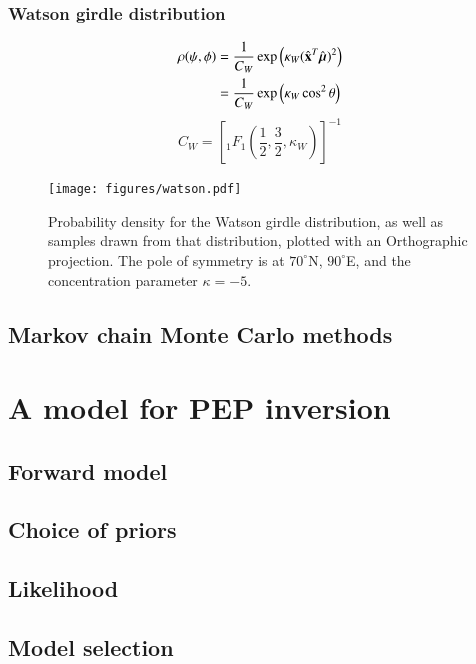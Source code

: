 \documentclass[preprint,12pt,authoryear]{elsarticle}
\newcommand{\mitbf}[1]{\hbox{\mathversion{bold}$#1$}}
\begin{document}
\subsubsection{Watson girdle distribution}
\begin{equation}
  \begin{aligned}
  \rho(\psi, \phi) 
  &= \frac{1}{C_W} \exp \left( \kappa_W (\hat{\mathbf{x}}^T \hat{\mitbf{\mu}})^2 \right) \\
  &= \frac{1}{C_W} \exp \left( \kappa_W \cos^2 \theta \right)
  \end{aligned}
\end{equation}
\begin{equation}
  C_W = \left[ {}_1 F_1 \left( \frac{1}{2}, \frac{3}{2}, \kappa_W \right) \right]^{-1}
\end{equation}

\begin{figure}
\texttt{[image: figures/watson.pdf]}
\caption{Probability density for the Watson girdle distribution, as well as samples drawn from that distribution, plotted with an Orthographic projection. The pole of symmetry is at $70^\circ$N, $90^\circ$E, and the concentration parameter $\kappa=-5$.}
\label{fig:watson}
\end{figure}
\subsection{Markov chain Monte Carlo methods}

\section{A model for PEP inversion}
\label{sec:model}
\subsection{Forward model}

\subsection{Choice of priors}

\subsection{Likelihood}

\subsection{Model selection}
\end{document}
